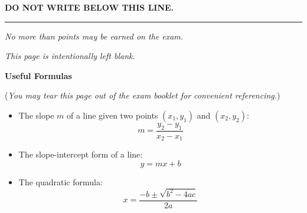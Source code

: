 \documentclass[addpoints,18pt,answers]{exam}
\begin{document}
\vspace{1.5cm}

\vfill

\bigskip
\centerline{\textbf{DO NOT WRITE BELOW THIS LINE.}}
\rule{\textwidth}{.2mm}

\vfill
\changefontsize{14pt}

\begin{center}
	\gradetable[v][pages]
	
	\vspace{12pt}
	\textit{No more than \numpoints{} points may be earned on the exam.}
	
\end{center}

\vfill

\newpage
\phantom{.}
\vfill
\begin{center}
   \textit{This page is intentionally left blank}.
\end{center}
\vfill

\newpage
\changefontsize{18pt}

\begin{center}
   {\Large \textbf{Useful Formulas}}
\end{center}

(\textit{You may tear this page out of the exam booklet for convenient referencing.})

\begin{itemize}
   \item The slope $m$ of a line given two points $(x_1,y_1)$ and $(x_2,y_2)$: 
   \[m = \frac{y_2-y_1}{x_2-x_1}\]
   \item The slope-intercept form of a line:
   \[y=mx+b\]
   \item The quadratic formula:
   \[x = \frac{-b\pm\sqrt{b^2-4ac}}{2a}\]
\end{itemize}
\end{document}
